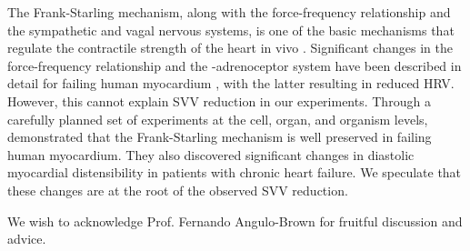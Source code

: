 \documentclass[%
preprint,
 amsmath,amssymb,
 aps,
]{revtex4-2}
\begin{document}
The Frank-Starling mechanism, along with the force-frequency relationship and the sympathetic and vagal nervous systems, is one of the basic mechanisms that regulate the contractile strength of the heart in vivo \citep{Holubarsch_1996}. Significant changes in the force-frequency relationship and the \textbeta-adrenoceptor system have been described in detail for failing human myocardium \citep{Mulieri_1992, Pieske_1992, Bristow_1982, Bristow_1989},  with the latter resulting in reduced HRV. However, this cannot explain SVV reduction in our experiments. Through a carefully planned set of experiments at the cell, organ, and organism levels, \citet{Holubarsch_1996} demonstrated that the Frank-Starling mechanism is well preserved in failing human myocardium. They also discovered significant changes in diastolic myocardial distensibility in patients with chronic heart failure. We speculate that these changes are at the root of the observed SVV reduction.

\begin{acknowledgments}
We wish to acknowledge Prof. Fernando Angulo-Brown for fruitful discussion and advice.
\end{acknowledgments}



\end{document}
